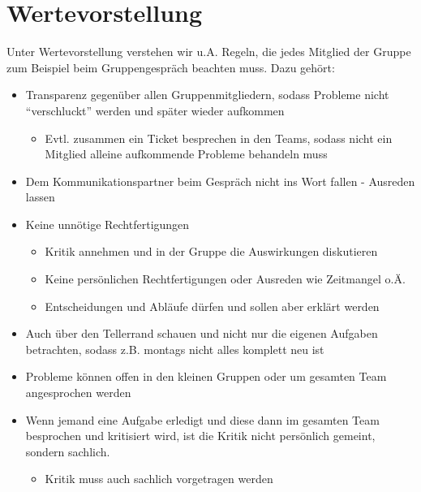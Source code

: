 \section{Wertevorstellung}
Unter Wertevorstellung verstehen wir u.A. Regeln, die jedes Mitglied der Gruppe zum Beispiel beim Gruppengespräch beachten muss. Dazu gehört:
\begin{itemize}
	\item Transparenz gegenüber allen Gruppenmitgliedern, sodass Probleme nicht "`verschluckt"' werden und später wieder aufkommen
	\begin{itemize}
		\item Evtl. zusammen ein Ticket besprechen in den Teams, sodass nicht ein Mitglied alleine aufkommende Probleme behandeln muss
	\end{itemize}
	\item Dem Kommunikationspartner beim Gespräch nicht ins Wort fallen - Ausreden lassen
	\item Keine unnötige Rechtfertigungen
	\begin{itemize}
		\item Kritik annehmen und in der Gruppe die Auswirkungen diskutieren
		\item Keine persönlichen Rechtfertigungen oder Ausreden wie Zeitmangel o.Ä.
		\item Entscheidungen und Abläufe dürfen und sollen aber erklärt werden
	\end{itemize}
	\item Auch über den Tellerrand schauen und nicht nur die eigenen Aufgaben betrachten, sodass z.B. montags nicht alles komplett neu ist
	\item Probleme können offen in den kleinen Gruppen oder um gesamten Team angesprochen werden
	\item Wenn jemand eine Aufgabe erledigt und diese dann im gesamten Team besprochen und kritisiert wird, ist die Kritik nicht persönlich gemeint, sondern sachlich. 
	\begin{itemize}
		\item Kritik muss auch sachlich vorgetragen werden
	\end{itemize}
\end{itemize}